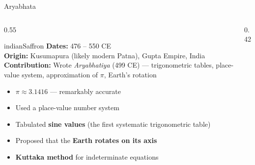 \begin{frame}[shrink=16]{Aryabhata}

  \begin{columns}[T]
    \begin{column}{0.55\textwidth}
      \begin{personbox}{indianSaffron}
        \small
        \textbf{Dates:} 476 -- 550 CE\\
        \textbf{Origin:} Kusumapura (likely modern Patna), Gupta Empire, India\\
        \textbf{Contribution:} Wrote \emph{Aryabhatiya} (499 CE) --- trigonometric tables,
        place-value system, approximation of $\pi$, Earth's rotation
      \end{personbox}

      \vspace{0.4em}
      \begin{itemize}
        \item $\pi \approx 3.1416$ --- remarkably accurate
        \item Used a \alert{place-value number system}
        \item Tabulated \textbf{sine values} (the first systematic trigonometric table)
        \item Proposed that the \textbf{Earth rotates on its axis}
        \item \textbf{Kuttaka method} for indeterminate equations
      \end{itemize}
    \end{column}

    \begin{column}{0.42\textwidth}

      \vspace{0.5em}
    \end{column}
  \end{columns}

\end{frame}

